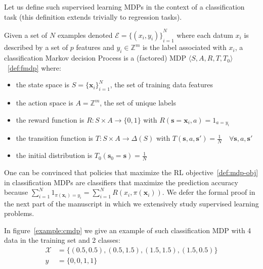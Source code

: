 Let us define such supervised learning MDPs in the context of a classification task (this definition extends trivially to regression tasks).
\begin{definition}\label{def:cmdp}
    Given a set of $N$ examples denoted $\mathcal{E} = {\{(x_i, y_i)\}}_{i=1}^N$ where each datum $x_i$ is described by a set of $p$ features and $y_i \in \mathbb{Z}^m$ is the label associated with $x_i$, a classification Markov decision Process is a (factored) MDP $\langle S, A, R, T, T_0 \rangle$~\ref{def:fmdp} where:
    \begin{itemize}
        \item the state space is $S={\{\boldsymbol{x}_i\}}_{i=1}^N$, the set of training data features
        \item the action space is $A=\mathbb{Z}^m$, the set of unique labels
        \item the reward function is $R:S\times A \rightarrow \{0, 1\}$ with $R(\boldsymbol{s}=\boldsymbol{x}_i, a) = 1_{a=y_i}$
        \item the transition function is $T:S\times A \rightarrow \Delta(S)$ with $T(\boldsymbol{s}, a, \boldsymbol{s}') = \frac{1}{N} \quad \forall \boldsymbol{s}, a, \boldsymbol{s}'$
        \item the initial distribution is $T_0(\boldsymbol{s}_0 = \boldsymbol{s}) = \frac{1}{N}$
    \end{itemize}
\end{definition}

One can be convinced that policies that maximize the RL objective~\ref{def:mdp-obj} in classification MDPs are classifiers that maximize the prediction accuracy because $\sum_{i=1}^N 1_{\pi(\boldsymbol{x}_i)=y_i} = \sum_{i=1}^N R(x_i, \pi(\boldsymbol{x}_i))$.
We defer the formal proof in the next part of the manuscript in which we extensively study supervised learning problems.

In figure~\ref{example:cmdp} we give an example of such classification MDP with 4 data in the training set and 2 classes:
\begin{align*}
    \mathcal{X} &= \{(0.5, 0.5), (0.5, 1.5), (1.5, 1.5), (1.5, 0.5)\}\\
    y &= \{0, 0, 1, 1\} 
\end{align*}

